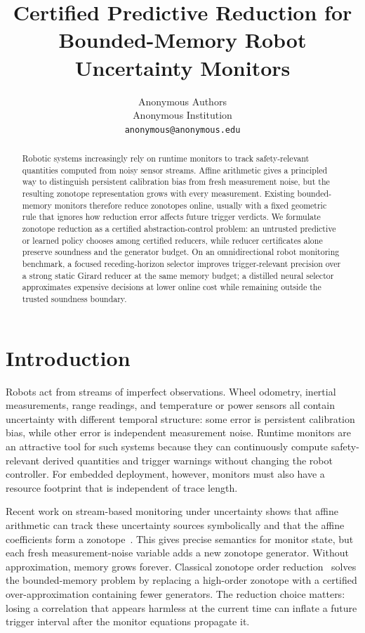 \documentclass{article}
\title{Certified Predictive Reduction for Bounded-Memory Robot Uncertainty Monitors}
\author{
  Anonymous Authors\\
  Anonymous Institution\\
  \texttt{anonymous@anonymous.edu}
}
\begin{document}
\maketitle

\begin{abstract}
Robotic systems increasingly rely on runtime monitors to track safety-relevant
quantities computed from noisy sensor streams. Affine arithmetic gives a
principled way to distinguish persistent calibration bias from fresh
measurement noise, but the resulting zonotope representation grows with every
measurement. Existing bounded-memory monitors therefore reduce zonotopes online,
usually with a fixed geometric rule that ignores how reduction error affects
future trigger verdicts. We formulate zonotope reduction as a certified
abstraction-control problem: an untrusted predictive or learned policy chooses
among certified reducers, while reducer certificates alone preserve soundness
and the generator budget. On an omnidirectional robot monitoring benchmark, a
focused receding-horizon selector improves trigger-relevant precision over a
strong static Girard reducer at the same memory budget; a distilled neural
selector approximates expensive decisions at lower online cost while remaining
outside the trusted soundness boundary.
\end{abstract}


\section{Introduction}

Robots act from streams of imperfect observations. Wheel odometry, inertial
measurements, range readings, and temperature or power sensors all contain
uncertainty with different temporal structure: some error is persistent
calibration bias, while other error is independent measurement noise. Runtime
monitors are an attractive tool for such systems because they can continuously
compute safety-relevant derived quantities and trigger warnings without changing
the robot controller. For embedded deployment, however, monitors must also have
a resource footprint that is independent of trace length.

Recent work on stream-based monitoring under uncertainty shows that affine
arithmetic can track these uncertainty sources symbolically and that the affine
coefficients form a zonotope~\citep{finkbeiner2026cutting}. This gives precise
semantics for monitor state, but each fresh measurement-noise variable adds a
new zonotope generator. Without approximation, memory grows forever. Classical
zonotope order reduction~\citep{girard2005reachability,yang2018comparison}
solves the bounded-memory problem by replacing a high-order zonotope with a
certified over-approximation containing fewer generators. The reduction choice
matters: losing a correlation that appears harmless at the current time can
inflate a future trigger interval after the monitor equations propagate it.
\end{document}
